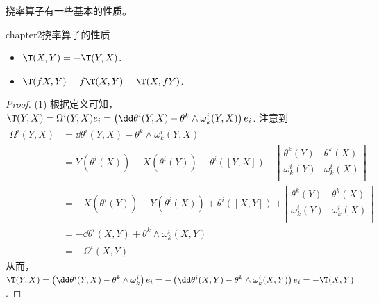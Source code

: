 挠率算子有一些基本的性质。
\begin{mythm}{}{chapter2挠率算子的性质}
	\begin{itemize}
		\item[(1)] $\T(X,Y)=-\T(Y,X)$.
		\item[(2)] $\T(fX,Y)=f \T(X,Y)=\T(X,fY)$.
	\end{itemize}
\end{mythm}
\begin{proof}
	(1)\; 根据定义可知，$\T(Y,X)=\Omega^{i}(Y,X)e_{i}= \left(\dd \theta^{i}(Y,X)-\theta^{k}\wedge\omega_{k}^{i}(Y,X)\right)e_{i}$. 注意到
	\[
	\begin{split}
	 \Omega^{i}(Y,X)&= \dd \theta^{i}(Y,X)-\theta^{k}\wedge \omega_{k}^{i}(Y,X) \\
	 &=Y\left(\theta^{i}(X) \right)-X\left(\theta^{i}(Y) \right)-\theta^{i}\left([Y,X] \right)-\left| \begin{array}{cc}{\theta^{k}(Y)} & {\theta^{k}(X)}\\ {\omega_{k}^{i}(Y)} & {\omega_{k}^{i}(X)}\\ \end{array}\right|\\
	 &= -X\left(\theta^{i}(Y) \right)+Y\left(\theta^{i}(X) \right)+\theta^{i}\left([X,Y] \right)+\left| \begin{array}{cc}{\theta^{k}(Y)} & {\theta^{k}(X)}\\ {\omega_{k}^{i}(Y)} & {\omega_{k}^{i}(X)}\\ \end{array}\right|\\
	 &=-\dd \theta^{i}(X,Y)+\theta^{k}\wedge \omega_{k}^{i}(X,Y) \\
	 &=-\Omega^{i}(X,Y)
	\end{split}
	\]
	从而，$\T(Y,X) = \left(\dd \theta^{i}(Y,X)-\theta^{k}\wedge\omega_{k}^{i}\right)e_{i}=-\left(\dd \theta^{i}(X,Y)-\theta^{k}\wedge \omega_{k}^{i}(X,Y) \right)e_{i} =-\T(X,Y)$.
	

\end{proof}
